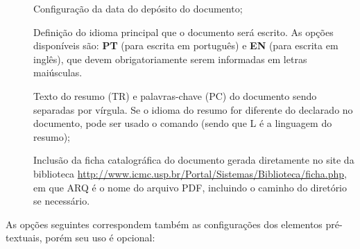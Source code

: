 \begin{description}
 \item[] Configuração da data do depósito do documento;
 
 \item[] Definição do idioma principal que o documento será escrito. As opções disponíveis são: \textbf{PT} (para escrita em português) e \textbf{EN} (para escrita em inglês), que devem obrigatoriamente serem informadas em letras maiúsculas.

 \item[] Texto do resumo (TR) e palavras-chave (PC) do documento sendo separadas por vírgula. Se o idioma do resumo for diferente do declarado no documento, pode ser usado o comando  (sendo que L é a linguagem do resumo);
 
 \item[] Inclusão da ficha catalográfica do documento gerada diretamente no site da biblioteca \url{http://www.icmc.usp.br/Portal/Sistemas/Biblioteca/ficha.php}, em que ARQ é o nome do arquivo PDF, incluindo o caminho do diretório se necessário.

 
\end{description}

As opções seguintes correspondem também as configurações dos elementos pré-textuais, porém seu uso é opcional: 

